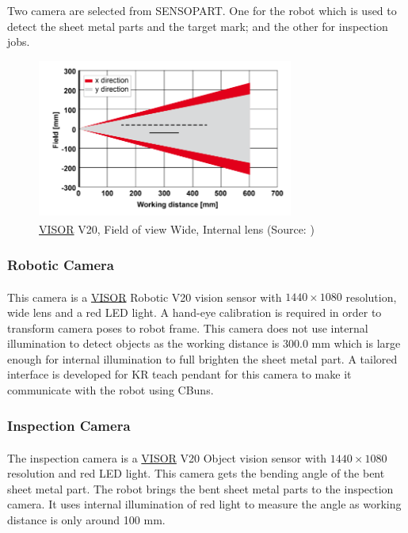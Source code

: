 Two camera are selected from SENSOPART. One for the robot which is used to detect the sheet metal parts and the target mark; and the other for inspection jobs.

\begin{figure}[h]
    \centering
    \includegraphics[width=0.75\textwidth]{figures/visor-v20-fov.png}
    \caption{\hyperref[acro:VISOR]{VISOR}\textsuperscript{\textregistered} V20, Field of view Wide, Internal lens (Source: \cite[page 357]{visor_user_manual})}
    \label{fig:visor-v20}
\end{figure}


\subsubsection{Robotic Camera}
\label{subsubsec:robotic-camera}
This camera is a \hyperref[acro:VISOR]{VISOR}\textsuperscript{\textregistered} Robotic V20 vision sensor with $1440 \times 1080$ resolution, wide lens and a red LED light.
\cite{visor-robotic}
A hand-eye calibration is required in order to transform camera poses to robot frame. This camera does not use internal illumination to detect
objects as the working distance is 300.0 mm which is large enough for internal illumination to full brighten the sheet metal part.
A tailored interface is developed for KR teach pendant for this camera to make it communicate with the robot using CBuns.

\subsubsection{Inspection Camera}
\label{subsubsec:inspection-camera}
The inspection camera is a \hyperref[acro:VISOR]{VISOR}\textsuperscript{\textregistered} V20 Object vision sensor with $1440 \times 1080$ resolution and red LED light.
\cite{visor-object}
This camera gets the bending angle
of the bent sheet metal part. The robot brings the bent sheet metal parts to the inspection camera. 
It uses internal illumination of red light to measure the angle as working distance is only around 100 mm. 